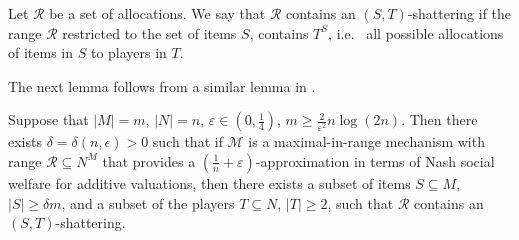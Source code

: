 \documentclass{article}
\newcommand{\eps}{\varepsilon}
\newcommand{\cM}{{\mathcal M}}
\newcommand{\cR}{{\mathcal R}}
\begin{document}
\begin{definition}
Let $\cR$ be a set of allocations. We say that $\cR$ contains an $(S,T)$-shattering if the range $\cR$ restricted to the set of items $S$, contains $T^S$, i.e.~ all possible allocations of items in $S$ to players in $T$.
\end{definition}

The next lemma follows from a similar lemma in \cite{BDFK10}.

\begin{lemma}
\label{lemma:shattering}
Suppose that $|M|=m$, $|N|=n$, $\eps \in (0,\frac14)$, $m \geq \frac{2}{\eps^2} n \log (2n)$. Then there exists $\delta = \delta(n,\epsilon)>0$ such that if $\cM$ is a maximal-in-range mechanism with range $\cR \subseteq N^M$ that provides a $(\frac{1}{n} + \eps)$-approximation in terms of Nash social welfare for additive valuations, then there exists a subset of items $S\subseteq M$, $|S| \geq \delta m$, and a subset of the players $T \subseteq N$, $|T|\geq 2$, such that $\cR$ contains an $(S,T)$-shattering.
\end{lemma}
\end{document}
